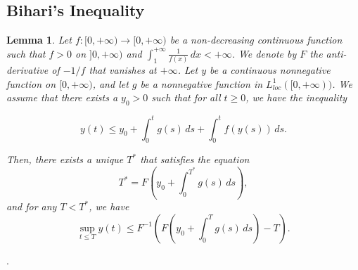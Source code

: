\documentclass[11pt]{article}
\newtheorem{lemma}[theorem]{Lemma}
\begin{document}
{%



\begin{appendices}

\section{Bihari's Inequality}\label{A:Bihari's}

\begin{lemma}
Let $f: [0, +\infty) \to [0, +\infty)$ be a non-decreasing continuous function such that $f > 0$ on $]0, +\infty)$ and $\int_1^{+\infty} \frac{1}{f(x)} \, dx < +\infty$. We denote by $F$ the anti-derivative of $-1/f$ that vanishes at $+\infty$. Let $y$ be a continuous nonnegative function on $[0, +\infty)$, and let $g$ be a nonnegative function in $L_{loc}^1([0, +\infty))$. We assume that there exists a $y_0 > 0$ such that for all $t \geq 0$, we have the inequality

\[
y(t) \leq y_0 + \int_0^t g(s) \, ds + \int_0^t f(y(s)) \, ds.
\]

Then, there exists a unique $T^*$ that satisfies the equation
\[
T^* = F\left(y_0 + \int_0^{T^*} g(s) \, ds\right),
\]
and for any $T < T^*$, we have
\[
\sup_{t \leq T} y(t) \leq F^{-1}\left(F\left(y_0 + \int_0^T g(s) \, ds\right) - T\right).
\]
\end{lemma}
\cite[see page 90]{bihari1956generalization}.





\end{appendices}}
\end{document}
